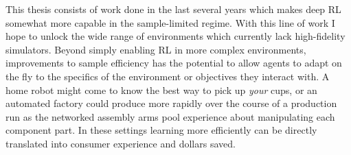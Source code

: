 \vspace{0.9\baselineskip}

This thesis consists of work done in the last several years which makes deep RL somewhat more capable in the sample-limited regime.
With this line of work I hope to unlock the wide range of environments which currently lack high-fidelity simulators.
Beyond simply enabling RL in more complex environments, improvements to sample efficiency has the potential to allow agents to adapt on the fly to the specifics of the environment or objectives they interact with.
A home robot might come to know the best way to pick up \emph{your} cups, or an automated factory could produce more rapidly over the course of a production run as the networked assembly arms pool experience about manipulating each component part.
In these settings learning more efficiently can be directly translated into consumer experience and dollars saved.










